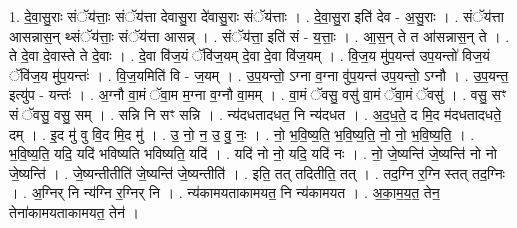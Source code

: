 \documentclass[17pt]{extarticle}
\begin{document}
1. दे॒वा॒सु॒राः संॅय॑त्ताः॒ संॅय॑त्ता देवासु॒रा दे॑वासु॒राः संॅय॑त्ताः । . दे॒वा॒सु॒रा इति॑ देव - अ॒सु॒राः । . संॅय॑त्ता आसन्नास॒न् थ्संॅय॑त्ताः॒ संॅय॑त्ता आसन्न् । . संॅय॑त्ता॒ इति॑ सं - य॒त्ताः॒ । . आ॒स॒न् ते त आ॑सन्नास॒न् ते । . ते दे॒वा दे॒वास्ते ते दे॒वाः । . दे॒वा वि॑ज॒यं ॅवि॑ज॒यम् दे॒वा दे॒वा वि॑ज॒यम् । . वि॒ज॒य मु॑प॒यन्त॑ उप॒यन्तो॑ विज॒यं ॅवि॑ज॒य मु॑प॒यन्तः॑ । . वि॒ज॒यमिति॑ वि - ज॒यम् । . उ॒प॒यन्तो॒ ऽग्ना व॒ग्ना वु॑प॒यन्त॑ उप॒यन्तो॒ ऽग्नौ । . उ॒प॒यन्त॒ इत्यु॑प - यन्तः॑ । . अ॒ग्नौ वा॒मं ॅवा॒म म॒ग्ना व॒ग्नौ वा॒मम् । . वा॒मं ॅवसु॒ वसु॑ वा॒मं ॅवा॒मं ॅवसु॑ । . वसु॒ सꣳ सं ॅवसु॒ वसु॒ सम् । . सन्नि नि सꣳ सन्नि । . न्य॑दधतादधत॒ नि न्य॑दधत । . अ॒द॒ध॒ते॒ द मि॒द म॑दधतादधते॒ दम् । . इ॒द मु॑ वु वि॒द मि॒द मु॑ । . उ॒ नो॒ न॒ उ॒ वु॒ नः॒ । . नो॒ भ॒वि॒ष्य॒ति॒ भ॒वि॒ष्य॒ति॒ नो॒ नो॒ भ॒वि॒ष्य॒ति॒ । . भ॒वि॒ष्य॒ति॒ यदि॒ यदि॑ भविष्यति भविष्यति॒ यदि॑ । . यदि॑ नो नो॒ यदि॒ यदि॑ नः । . नो॒ जे॒ष्यन्ति॑ जे॒ष्यन्ति॑ नो नो जे॒ष्यन्ति॑ । . जे॒ष्यन्तीतीति॑ जे॒ष्यन्ति॑ जे॒ष्यन्तीति॑ । . इति॒ तत् तदितीति॒ तत् । . तद॒ग्नि र॒ग्नि स्तत् तद॒ग्निः । . अ॒ग्निर् नि न्य॑ग्नि र॒ग्निर् नि । . न्य॑कामयताकामयत॒ नि न्य॑कामयत । . अ॒का॒म॒य॒त॒ तेन॒ तेना॑कामयताकामयत॒ तेन॑ । \newline
\end{document}
